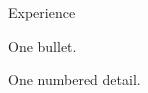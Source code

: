 \documentclass[icons=false]{yuan2resume}
\begin{document}
\maketitle

\begin{cvtwocolumn}
\begin{cvsection}{Experience}
  \begin{cvitemize}
    \item One bullet.
  \end{cvitemize}
  \begin{cventry}
    \begin{cvnumlist}
      \item One numbered detail.
    \end{cvnumlist}
  \end{cventry}
  \cvgap
\end{cvsection}
\end{cvtwocolumn}
\end{document}
